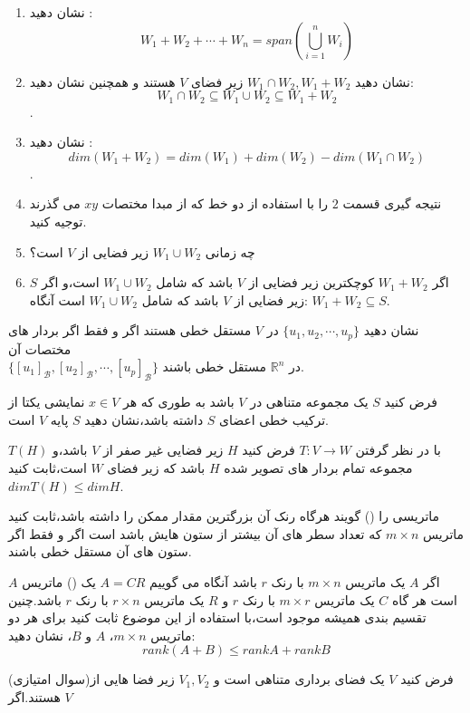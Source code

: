 \documentclass{article}
\begin{document}
\begin{enumerate}
	\item 
	نشان دهید :
	$$W_1+W_2+\cdots+W_n=span(\bigcup_{i=1}^{n}W_i)$$
	\item 
	نشان دهید 
	$W_1\cap W_2,W_1+W_2$
	زیر فضای 
	$V$
	هستند و همچنین نشان دهید:
	$$W_1\cap W_2 \subseteq W_1\cup W_2\subseteq W_1+W_2$$.
	\item 
	نشان دهید :
	$$dim(W_1+W_2)=dim(W_1)+dim(W_2)-dim(W_1\cap W_2)$$.
	\item 
	نتیجه گیری قسمت 
	$2$
	را با استفاده از دو خط که از مبدا مختصات 
	$xy$
	می گذرند توجیه کنید.
	\item 
	چه زمانی 
	$W_1\cup W_2$
	زیر فضایی از 
	$V$
	است؟
	\item 
	اگر 
	$W_1+W_2$
	کوچکترین زیر فضایی از 
	$V$
	باشد که شامل 
	$W_1\cup W_2$
	است،و اگر 
	$S$
	زیر فضایی از 
	$V$
	باشد که شامل 
	$W_1\cup W_2$
	است آنگاه:
	$W_1+W_2\subseteq S$.
	
\end{enumerate}
نشان دهید 
$\{u_1,u_2,\cdots,u_p\}$
در 
$V$
مستقل خطی هستند اگر و فقط اگر بردار های مختصات آن\\

$\{[u_1]_\mathcal{B},[u_2]_\mathcal{B},\cdots,[u_p]_\mathcal{B}\}$
در 
$\mathbb{R}^n$
مستقل خطی باشند.


 فرض کنید 
$S$
یک مجموعه متناهی در 
$V$
باشد به طوری که هر 
$x\in V$
نمایشی یکتا از ترکیب خطی اعضای 
$S$
داشته باشد،نشان دهید 
$S$
پایه 
$V$
است.

با در نظر گرفتن 
$T:V\longrightarrow W$
فرض کنید 
$H$
زیر فضایی غیر صفر از 
$V$
باشد،و 
$T(H)$
مجموعه تمام بردار های تصویر شده 
$H$
باشد که زیر فضای 
$W$
است،ثابت کنید
$dim T(H)\leq dim H$.


ماتریسی را 
()
گویند هرگاه رنک آن بزرگترین مقدار ممکن را داشته باشد،ثابت کنید ماتریس 
$m\times n$
که تعداد سطر های آن بیشتر از ستون هایش باشد 
است اگر و فقط اگر ستون های آن مستقل خطی باشند. 

اگر 
$A$
یک ماتریس 
$m\times n$
با رنک 
$r$
باشد آنگاه می گوییم 
$A=CR$
 یک 
()
ماتریس 
$A$
است هر گاه
$C$
یک ماتریس 
$m\times r$
با رنک
$r$
و 
$R$
یک ماتریس 
$r\times n$
با رنک 
$r$
باشد.چنین تقسیم بندی همیشه موجود است،با استفاده از این موضوع ثابت کنید برای هر دو ماتریس 
$m\times n$،
$A$
و
$B$،
نشان دهید:
$$rank(A+B)\leq rank A+rank B$$

(سوال امتیازی)فرض کنید
$V$
 یک فضای برداری متناهی است و 
$V_1,V_2$
زیر فضا هایی از 
$V$
هستند.اگر 
\end{document}
